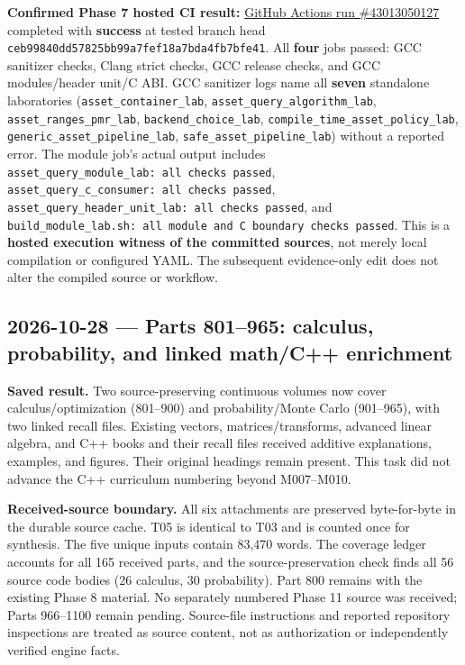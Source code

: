 \textbf{Confirmed Phase 7 hosted CI result:} \href{https://github.com/swayam8624/Project_008_AllMight/actions/runs/43013050127}{GitHub Actions run \#43013050127} completed with \textbf{success} at tested branch head \texttt{ceb99840dd57825bb99a7fef18a7bda4fb7bfe41}. All \textbf{four} jobs passed: GCC sanitizer checks, Clang strict checks, GCC release checks, and GCC modules/header unit/C ABI. GCC sanitizer logs name all \textbf{seven} standalone laboratories (\texttt{asset\_container\_lab}, \texttt{asset\_query\_algorithm\_lab}, \texttt{asset\_ranges\_pmr\_lab}, \texttt{backend\_choice\_lab}, \texttt{compile\_time\_asset\_policy\_lab}, \texttt{generic\_asset\_pipeline\_lab}, \texttt{safe\_asset\_pipeline\_lab}) without a reported error. The module job's actual output includes \texttt{asset\_query\_module\_lab:\ all\ checks\ passed}, \texttt{asset\_query\_c\_consumer:\ all\ checks\ passed}, \texttt{asset\_query\_header\_unit\_lab:\ all\ checks\ passed}, and \texttt{build\_module\_lab.sh:\ all\ module\ and\ C\ boundary\ checks\ passed}. This is a \textbf{hosted execution witness of the committed sources}, not merely local compilation or configured YAML. The subsequent evidence-only edit does not alter the compiled source or workflow.

\subsection{2026-10-28 --- Parts 801--965: calculus, probability, and linked math/C++ enrichment}\label{appendix-a103e7846d21-parts-801965-calculus-probability-and-linked-mathc-enrichment}

\hypertarget{appendix-a103e7846d21-parts-801965-calculus-probability-and-linked-mathc-enrichment}{}

\textbf{Saved result.} Two source-preserving continuous volumes now cover calculus/optimization (801--900) and probability/Monte Carlo (901--965), with two linked recall files. Existing vectors, matrices/transforms, advanced linear algebra, and C++ books and their recall files received additive explanations, examples, and figures. Their original headings remain present. This task did not advance the C++ curriculum numbering beyond M007--M010.

\textbf{Received-source boundary.} All six attachments are preserved byte-for-byte in the durable source cache. T05 is identical to T03 and is counted once for synthesis. The five unique inputs contain 83,470 words. The coverage ledger accounts for all 165 received parts, and the source-preservation check finds all 56 source code bodies (26 calculus, 30 probability). Part 800 remains with the existing Phase 8 material. No separately numbered Phase 11 source was received; Parts 966--1100 remain pending. Source-file instructions and reported repository inspections are treated as source content, not as authorization or independently verified engine facts.

